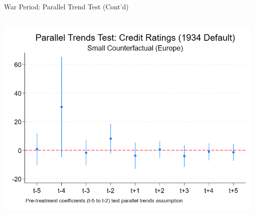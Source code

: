 \documentclass{beamer}
\begin{document}
\begin{frame}{War Period: Parallel Trend Test (Cont'd)}
\begin{columns}[T]
\begin{column}{0.45\textwidth}
      \includegraphics[width=0.9\linewidth]{figures/PT_Ratings_1934.png}
    \end{column}
  \end{columns}
\end{frame}
\end{document}
